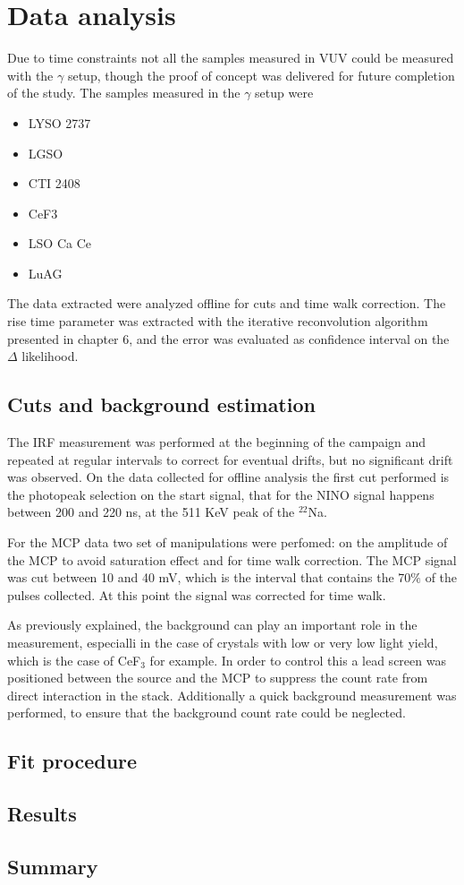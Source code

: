 
\section{Data analysis}
Due to time constraints not all the samples measured in VUV could be measured with the $\gamma$ setup, though the proof of concept was delivered for future completion of the study.
The samples measured in the $\gamma$ setup were
\begin{itemize}
\item LYSO 2737
\item LGSO
\item CTI 2408
\item CeF3
\item LSO Ca Ce
\item LuAG %
\end{itemize}
The data extracted were analyzed offline for cuts and time walk correction. 
The rise time parameter was extracted with the iterative reconvolution algorithm presented in chapter 6, and the error was evaluated as confidence interval on the $\Delta$ likelihood.

\subsection{Cuts and background estimation}
The IRF measurement was performed at the beginning of the campaign and repeated at regular intervals to correct for eventual drifts, but no significant drift was observed.
On the data collected for offline analysis the first cut performed is the photopeak selection on the start signal, that for the NINO signal happens between 200 and 220 ns, at the 511 KeV peak of the $^{22}$Na.

For the MCP data two set of manipulations were perfomed: on the amplitude of the MCP to avoid saturation effect and for time walk correction. 
The MCP signal was cut between 10 and 40 mV, which is the interval that contains the 70$\%$ of the pulses collected. At this point the signal was corrected for time walk.

As previously explained, the background can play an important role in the measurement, especialli in the case of crystals with low or very low light yield, which is the case of CeF$_{3}$ for example. 
In order to control this a lead screen was positioned between the source and the MCP to suppress the count rate from direct interaction in the stack. Additionally a quick background measurement was performed, to ensure that the background count rate could be neglected.

\subsection{Fit procedure}

\subsection{Results}
\subsection{Summary}